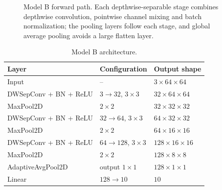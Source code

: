 \documentclass[11pt]{article}
\begin{document}
\begin{figure}[H]
\centering
{}
\caption{Model B forward path. Each depthwise-separable stage combines
depthwise convolution, pointwise channel mixing and batch normalization;
the pooling layers follow each stage, and global average pooling avoids a
large flatten layer.}
\label{fig:model-b-pipeline}
\end{figure}

\begin{table}[H]
\centering
\caption{Model B architecture.}
\label{tab:model-b-arch}
\begin{tabular}{lll}
\toprule
Layer & Configuration & Output shape \\
\midrule
Input & -- & $3 \times 64 \times 64$ \\
DWSepConv + BN + ReLU & $3 \rightarrow 32$, $3\times3$ & $32 \times 64 \times 64$ \\
MaxPool2D & $2\times2$ & $32 \times 32 \times 32$ \\
DWSepConv + BN + ReLU & $32 \rightarrow 64$, $3\times3$ & $64 \times 32 \times 32$ \\
MaxPool2D & $2\times2$ & $64 \times 16 \times 16$ \\
DWSepConv + BN + ReLU & $64 \rightarrow 128$, $3\times3$ & $128 \times 16 \times 16$ \\
MaxPool2D & $2\times2$ & $128 \times 8 \times 8$ \\
AdaptiveAvgPool2D & output $1\times1$ & $128 \times 1 \times 1$ \\
Linear & $128 \rightarrow 10$ & $10$ \\
\bottomrule
\end{tabular}
\end{table}
\end{document}
